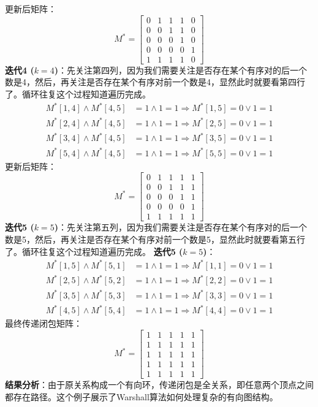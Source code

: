 更新后矩阵：
\[
M^* = \begin{bmatrix}
0 & 1 & 1 & 1 & 0 \\
0 & 0 & 1 & 1 & 0 \\
0 & 0 & 0 & 1 & 0 \\
0 & 0 & 0 & 0 & 1 \\
1 & 1 & 1 & 1 & 0
\end{bmatrix}
\]
\textbf{迭代4 ($k=4$)}：先关注第四列，因为我们需要关注是否存在某个有序对的后一个数是4，然后，再关注是否存在某个有序对前一个数是4，显然此时就要看第四行了。循环往复这个过程知道遍历完成。
\begin{align*}
M^*[1,4] \land M^*[4,5] &= 1 \land 1 = 1 \Rightarrow M^*[1,5] = 0 \lor 1 = 1 \\
M^*[2,4] \land M^*[4,5] &= 1 \land 1 = 1 \Rightarrow M^*[2,5] = 0 \lor 1 = 1 \\
M^*[3,4] \land M^*[4,5] &= 1 \land 1 = 1 \Rightarrow M^*[3,5] = 0 \lor 1 = 1 \\
M^*[5,4] \land M^*[4,5] &= 1 \land 1 = 1 \Rightarrow M^*[5,5] = 0 \lor 1 = 1
\end{align*}
更新后矩阵：
\[
M^* = \begin{bmatrix}
0 & 1 & 1 & 1 & 1 \\
0 & 0 & 1 & 1 & 1 \\
0 & 0 & 0 & 1 & 1 \\
0 & 0 & 0 & 0 & 1 \\
1 & 1 & 1 & 1 & 1
\end{bmatrix}
\]
\textbf{迭代5 ($k=5$)}：先关注第五列，因为我们需要关注是否存在某个有序对的后一个数是5，然后，再关注是否存在某个有序对前一个数是5，显然此时就要看第五行了。循环往复这个过程知道遍历完成。
\textbf{迭代5 ($k=5$)}：
\begin{align*}
M^*[1,5] \land M^*[5,1] &= 1 \land 1 = 1 \Rightarrow M^*[1,1] = 0 \lor 1 = 1 \\
M^*[2,5] \land M^*[5,2] &= 1 \land 1 = 1 \Rightarrow M^*[2,2] = 0 \lor 1 = 1 \\
M^*[3,5] \land M^*[5,3] &= 1 \land 1 = 1 \Rightarrow M^*[3,3] = 0 \lor 1 = 1 \\
M^*[4,5] \land M^*[5,4] &= 1 \land 1 = 1 \Rightarrow M^*[4,4] = 0 \lor 1 = 1
\end{align*}
最终传递闭包矩阵：
\[
M^* = \begin{bmatrix}
1 & 1 & 1 & 1 & 1 \\
1 & 1 & 1 & 1 & 1 \\
1 & 1 & 1 & 1 & 1 \\
1 & 1 & 1 & 1 & 1 \\
1 & 1 & 1 & 1 & 1
\end{bmatrix}
\]
\textbf{结果分析}：由于原关系构成一个有向环，传递闭包是全关系，即任意两个顶点之间都存在路径。这个例子展示了Warshall算法如何处理复杂的有向图结构。
